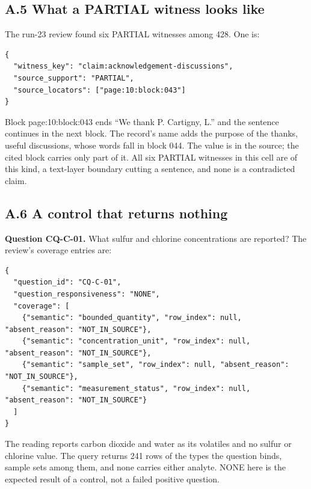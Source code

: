 \subsection*{A.5 What a PARTIAL witness looks like}

\par\medskip
\noindent\begin{minipage}{\linewidth}
The run-23 review found six PARTIAL witnesses among 428. One is:

\begin{lstlisting}
{
  "witness_key": "claim:acknowledgement-discussions",
  "source_support": "PARTIAL",
  "source_locators": ["page:10:block:043"]
}
\end{lstlisting}
\end{minipage}\par\medskip

Block page:10:block:043 ends “We thank P. Cartigny, L.” and the sentence continues in the next block. The record's name adds the purpose of the thanks, useful discussions, whose words fall in block 044. The value is in the source; the cited block carries only part of it. All six PARTIAL witnesses in this cell are of this kind, a text-layer boundary cutting a sentence, and none is a contradicted claim.

\subsection*{A.6 A control that returns nothing}

\par\medskip
\noindent\begin{minipage}{\linewidth}
\textbf{Question CQ-C-01.} What sulfur and chlorine concentrations are reported? The review's coverage entries are:

\begin{lstlisting}
{
  "question_id": "CQ-C-01",
  "question_responsiveness": "NONE",
  "coverage": [
    {"semantic": "bounded_quantity", "row_index": null, "absent_reason": "NOT_IN_SOURCE"},
    {"semantic": "concentration_unit", "row_index": null, "absent_reason": "NOT_IN_SOURCE"},
    {"semantic": "sample_set", "row_index": null, "absent_reason": "NOT_IN_SOURCE"},
    {"semantic": "measurement_status", "row_index": null, "absent_reason": "NOT_IN_SOURCE"}
  ]
}
\end{lstlisting}
\end{minipage}\par\medskip

The reading reports carbon dioxide and water as its volatiles and no sulfur or chlorine value. The query returns 241 rows of the types the question binds, sample sets among them, and none carries either analyte. NONE here is the expected result of a control, not a failed positive question.

